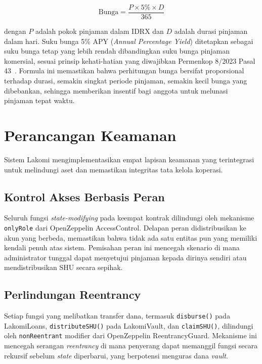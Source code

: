 \begin{equation}
\text{Bunga} = \frac{P \times 5\% \times D}{365}
\label{eq:bunga}
\end{equation}

\noindent dengan $P$ adalah pokok pinjaman dalam IDRX dan $D$ adalah durasi pinjaman dalam hari. Suku bunga 5\% APY (\textit{Annual Percentage Yield}) ditetapkan sebagai suku bunga tetap yang lebih rendah dibandingkan suku bunga pinjaman komersial, sesuai prinsip kehati-hatian yang diwajibkan Permenkop 8/2023 Pasal 43~\cite{permenkop82023}. Formula ini memastikan bahwa perhitungan bunga bersifat proporsional terhadap durasi, semakin singkat periode pinjaman, semakin kecil bunga yang dibebankan, sehingga memberikan insentif bagi anggota untuk melunasi pinjaman tepat waktu.

\section{Perancangan Keamanan}

Sistem Lakomi mengimplementasikan empat lapisan keamanan yang terintegrasi untuk melindungi aset dan memastikan integritas tata kelola koperasi.

\subsection{Kontrol Akses Berbasis Peran}

Seluruh fungsi \textit{state-modifying} pada keempat kontrak dilindungi oleh mekanisme \texttt{onlyRole} dari OpenZeppelin AccessControl. Delapan peran didistribusikan ke akun yang berbeda, memastikan bahwa tidak ada satu entitas pun yang memiliki kendali penuh atas sistem. Pemisahan peran ini mencegah skenario di mana administrator tunggal dapat menyetujui pinjaman kepada dirinya sendiri atau mendistribusikan SHU secara sepihak.

\subsection{Perlindungan Reentrancy}

Setiap fungsi yang melibatkan transfer dana, termasuk \texttt{disburse()} pada LakomiLoans, \texttt{distributeSHU()} pada LakomiVault, dan \texttt{claimSHU()}, dilindungi oleh \texttt{nonReentrant} modifier dari OpenZeppelin ReentrancyGuard. Mekanisme ini mencegah serangan \textit{reentrancy} di mana penyerang dapat memanggil fungsi secara rekursif sebelum \textit{state} diperbarui, yang berpotensi menguras dana \textit{vault}.


